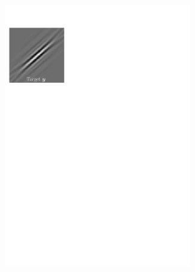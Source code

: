 \begin{figure}[!ht]\centering
\begin{subfigure}[b]{0.32\textwidth}\centering
	\includegraphics[width=0.9\textwidth]{figures/xp_explain/target.pdf}
	\caption{}
\end{subfigure}
\begin{subfigure}[b]{0.32\textwidth}\centering

\end{subfigure}
\end{figure}
